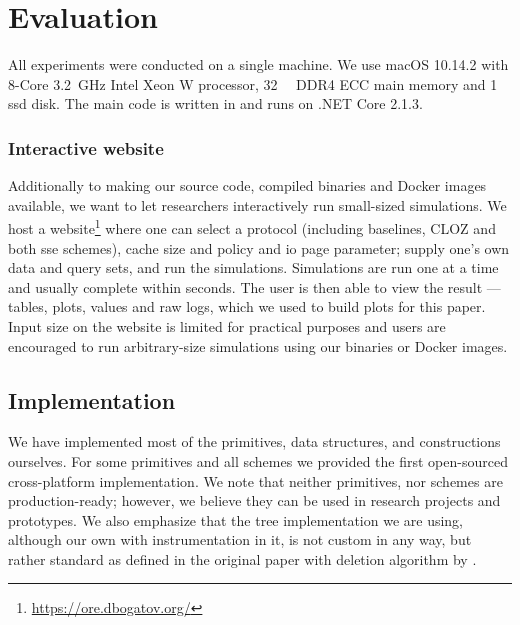\section{Evaluation}\label{section:range-snapshot:evaluation}

	All experiments were conducted on a single machine.
	We use macOS 10.14.2 with 8-Core \SI{3.2}{\giga\hertz} Intel Xeon W processor, \SI{32}{\giga\byte} DDR4 ECC main memory and \SI{1}{\tera\byte} \acrshort{ssd} disk.
	The main code is written in {\Csharp} and runs on {.NET Core 2.1.3}.

	\subsubsection*{Interactive website}\label{section:range-snapshot:website}

		Additionally to making our source code, compiled binaries and Docker images available, we want to let researchers interactively run small-sized simulations.
		We host a website\footnote{\url{https://ore.dbogatov.org/}} where one can select a protocol (including baselines, CLOZ \cite{parameter-hiding-ore} and both \acrshort{sse} schemes), cache size and policy and \acrshort{io} page parameter; supply one's own data and query sets, and run the simulations.
		Simulations are run one at a time and usually complete within seconds.
		The user is then able to view the result --- tables, plots, values and raw logs, which we used to build plots for this paper.
		Input size on the website is limited for practical purposes and users are encouraged to run arbitrary-size simulations using our binaries or Docker images.

	\subsection{Implementation}

		We have implemented most of the primitives, data structures, and constructions ourselves.
		For some primitives and all schemes we provided the first open-sourced cross-platform {\Csharp} implementation.
		We note that neither primitives, nor schemes are production-ready; however, we believe they can be used in research projects and prototypes.
		We also emphasize that the {\BPlus} tree implementation we are using, although our own with instrumentation in it, is not custom in any way, but rather standard as defined in the original paper \cite{b-tree} with deletion algorithm by \cite{b-plus-tree-deletion}.

